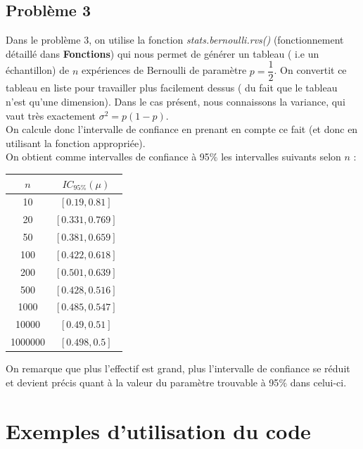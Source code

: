 \documentclass{article}      %
\begin{document}
\subsection{Problème 3}
Dans le problème 3, on utilise la fonction \textit{stats.bernoulli.rvs()} (fonctionnement détaillé dans \textbf{Fonctions}) qui nous permet de générer un tableau ( i.e un échantillon) de $n$ expériences de Bernoulli de paramètre $p = \dfrac{1}{2}$. On convertit ce tableau en liste pour travailler plus facilement dessus ( du fait que le tableau n'est qu'une dimension). Dans le cas présent, nous connaissons la variance, qui vaut très exactement $\sigma^{2} = p(1-p)$.\\
On calcule donc l'intervalle de confiance en prenant en compte ce fait (et donc en utilisant la fonction appropriée).\\
On obtient comme intervalles de confiance à 95$\%$ les intervalles suivants selon $n$ : \\
\newline
\begin{center}
	\begin{tabular}{|c|c|}
		\hline 
		$n$ & $IC_{95\%}(\mu)$ \\ 
		\hline 
		10 & $[0.19, 0.81]$ \\ 
		\hline 
		20 & $[0.331, 0.769]$ \\ 
		\hline 
		50 & $[0.381, 0.659]$ \\ 
		\hline 
		100 & $[0.422, 0.618]$ \\ 
		\hline 
		200 & $[0.501, 0.639]$ \\ 
		\hline 
		500 & $[0.428, 0.516]$ \\ 
		\hline 
		1000 & $[0.485, 0.547]$ \\ 
		\hline 
		10000 & $[0.49, 0.51]$ \\ 
		\hline 
		1000000 & $[0.498, 0.5]$ \\ 
		\hline 
	\end{tabular}
\end{center}

On remarque que plus l'effectif est grand, plus l'intervalle de confiance se réduit et devient précis quant à la valeur du paramètre trouvable à 95$\%$ dans celui-ci. 

\section{Exemples d'utilisation du code}
\end{document}
